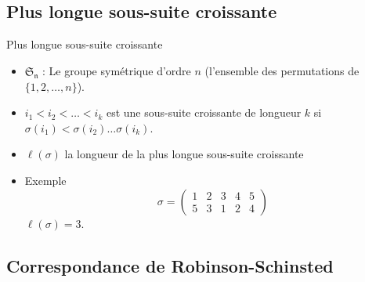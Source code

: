 \documentclass[french]{beamer}
\begin{document}
\subsection{Plus longue sous-suite croissante}
\begin{frame}{Plus longue sous-suite croissante}
\begin{itemize}

\item $\mathfrak{S_n}$ : Le groupe symétrique d'ordre $n$ (l'ensemble des permutations de $\{1,2,\dots,n\}$).
\\ 
\item $i_1<i_2<\dots<i_k$ est une sous-suite croissante de longueur $k$ si $\sigma(i_1)<\sigma(i_2)\dots\sigma(i_k)$.

\item $\ell(\sigma)$  la longueur de la plus longue sous-suite croissante
\item Exemple \begin{equation*}\sigma=\begin{pmatrix}
 1& 2 & 3 & 4 & 5 \\ 
 5& 3 & 1 & 2 & 4 
\end{pmatrix}
\end{equation*}
$\ell(\sigma)=3$.

\end{itemize}
\end{frame}
\subsection{Correspondance de Robinson-Schinsted}
\end{document}
